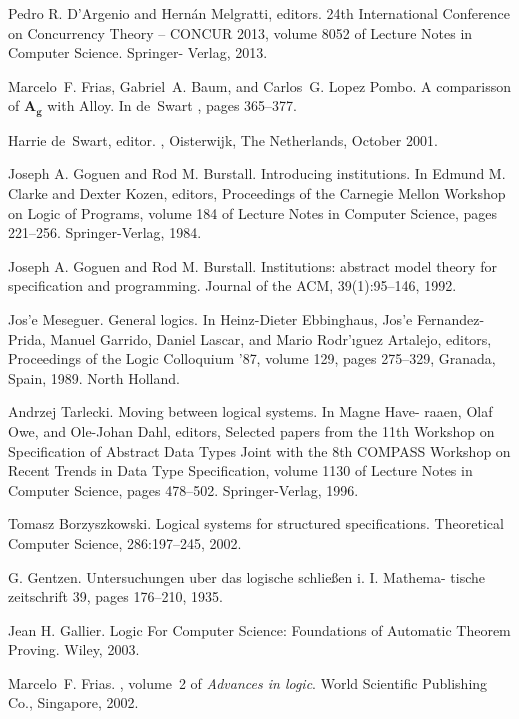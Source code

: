 \begin{thebibliography}{tesis}
 Pedro R. D’Argenio and Hernán Melgratti, editors. 24th International Conference on Concurrency Theory – CONCUR 2013, volume 8052 of Lecture Notes in Computer Science. Springer- Verlag, 2013.

Marcelo~{F.} Frias, Gabriel~{A.} Baum, and Carlos~{G.} {Lopez Pombo}.
\newblock A comparisson of $\mathbf{A_g}$ with {Alloy}.
\newblock In de~Swart \cite{relmics01}, pages 365--377.

Harrie de~Swart, editor.
, Oisterwijk, The Netherlands, October 2001.
  
	Joseph A. Goguen and Rod M. Burstall. Introducing institutions. In Edmund M. Clarke and Dexter Kozen, editors, Proceedings of the Carnegie Mellon Workshop on Logic of Programs, volume 184 of Lecture Notes in Computer Science, pages 221–256. Springer-Verlag, 1984.

  Joseph A. Goguen and Rod M. Burstall. Institutions: abstract model theory for specification and programming. Journal of the ACM, 39(1):95–146, 1992.

	Jos'e Meseguer. General logics. In Heinz-Dieter Ebbinghaus, Jos'e Fernandez-Prida, Manuel Garrido, Daniel Lascar, and Mario Rodr'ıguez Artalejo, editors, Proceedings of the Logic Colloquium ’87, volume 129, pages 275–329, Granada, Spain, 1989. North Holland.

	Andrzej Tarlecki. Moving between logical systems. In Magne Have- raaen, Olaf Owe, and Ole-Johan Dahl, editors, Selected papers from the 11th Workshop on Specification of Abstract Data Types Joint with the 8th COMPASS Workshop on Recent Trends in Data Type Specification, volume 1130 of Lecture Notes in Computer Science, pages 478–502. Springer-Verlag, 1996.

	Tomasz Borzyszkowski. Logical systems for structured specifications. Theoretical Computer Science, 286:197–245, 2002.

	G. Gentzen. Untersuchungen uber das logische schließen i. I. Mathema- tische zeitschrift 39, pages 176–210, 1935.
	
	Jean H. Gallier. Logic For Computer Science: Foundations of Automatic Theorem Proving. Wiley, 2003.

Marcelo~{F.} Frias.
, volume~2
  of {\em Advances in logic}.
\newblock World Scientific Publishing Co., Singapore, 2002.


\end{thebibliography}
